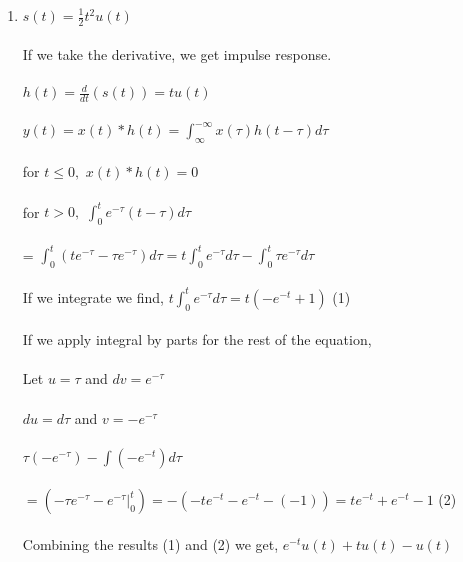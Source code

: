 \documentclass[10pt,a4paper, margin=1in]{article}
\begin{document}
\begin{enumerate}
\item %
$s(t) = \frac{1}{2}t^{2}u(t)$\\\\
If we take the derivative, we get impulse response.\\\\
$h(t) = \frac{d}{dt}(s(t)) = tu(t)$\\\\
$y(t) = x(t)*h(t) = \int^{-\infty}_{\infty}x(\tau)h(t-\tau)d\tau$\\\\
for $t \leq 0,$  $x(t)*h(t) = 0$\\\\
for $t > 0,$  $\int^{t}_{0}e^{-\tau}(t-\tau)d\tau$\\\\
= $\int^{t}_{0}(te^{-\tau} - \tau e^{-\tau})d\tau = t\int^{t}_{0}e^{-\tau}d\tau - \int^{t}_{0}\tau e^{-\tau}d\tau$\\\\
If we integrate we find, $t\int^{t}_{0}e^{-\tau}d\tau = t(-e^{-t}+1)$   (1)\\\\  If we apply integral by parts for the rest of the equation,\\\\
Let $u = \tau$ and $dv = e^{-\tau}$\\\\
$du = d\tau$ and $ v = -e^{-\tau}$\\\\
$\tau(-e^{-\tau}) - \int(-e^{-t})d\tau$\\\\
$ = (-\tau e^{-\tau} - e^{-\tau} |^{t}_{0}) = -(-te^{-t} - e^{-t} - (-1)) = te^{-t} + e^{-t} -1$   (2)\\\\
Combining the results (1) and (2) we get, $e^{-t}u(t) + tu(t) -u(t)$\\\\






\end{enumerate}
\end{document}
